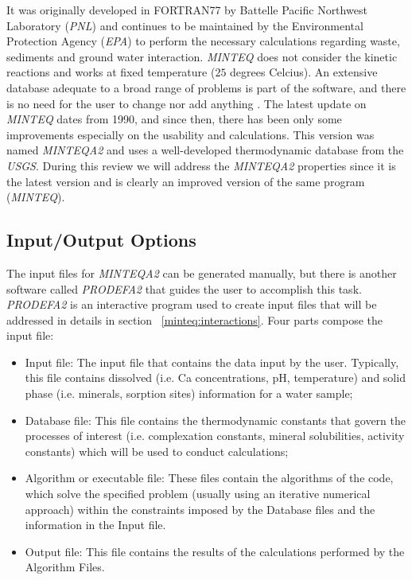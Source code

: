 It was originally developed in FORTRAN77 by Battelle Pacific Northwest Laboratory (\emph{PNL}) and continues to be maintained by the Environmental Protection Agency (\emph{EPA}) to perform the  necessary calculations regarding waste, sediments and ground water interaction. \emph{MINTEQ} does not consider the kinetic reactions and works at fixed temperature ($25$ degrees Celcius). 
An extensive database adequate to a broad range of problems is part of the software, and there is no need for the user to change nor add anything \cite{Brown:87} \cite{Allison:91}. The latest update on \emph{MINTEQ} dates from 1990, and since then, there has been only some improvements especially on the usability and calculations. This version was named \emph{MINTEQA2} and uses a well-developed thermodynamic database from the \emph{USGS}. During this review we will address the \emph{MINTEQA2} properties since it is the latest version and is clearly an improved version of the same program (\emph{MINTEQ}).

\subsection{Input/Output Options}
The input files for \emph{MINTEQA2} can be generated manually, but there is another software called \emph{PRODEFA2} that guides the user to accomplish this task. \emph{PRODEFA2} is an interactive program used to create input files that will be addressed in details in section ~\ref{minteq:interactions}. Four parts compose the input file:
\begin{itemize}
\item Input file: The input file that contains the data input by the user. Typically, this file contains dissolved (i.e. Ca concentrations, pH, temperature) and solid phase (i.e. minerals, sorption sites) information for a water sample;
\item Database file: This file contains the thermodynamic constants that govern the processes of interest (i.e. complexation constants, mineral solubilities, activity constants) which will be used to conduct calculations;
\item Algorithm or executable file:  These files contain the algorithms of the code, which solve the specified problem (usually using an iterative numerical approach) within the constraints imposed by the Database files and the information in the Input file.
\item Output file: This file contains the results of the calculations performed by the Algorithm Files.
\end{itemize}

